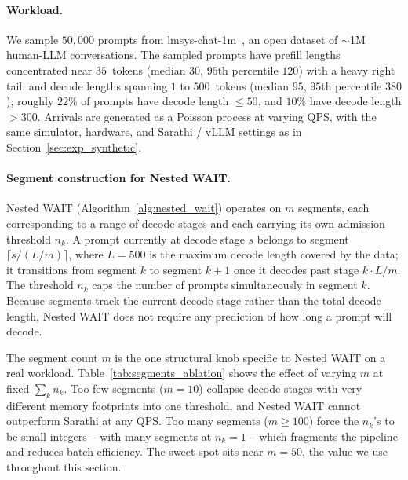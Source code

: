 \paragraph{Workload.}
We sample $50{,}000$ prompts from lmsys-chat-1m~\citep{zheng2023lmsys}, an open dataset of $\sim$1M human-LLM conversations. The sampled prompts have prefill lengths concentrated near $35$~tokens (median $30$, $95$th percentile $120$) with a heavy right tail, and decode lengths spanning $1$ to $500$~tokens (median $95$, $95$th percentile $380$); roughly $22\%$ of prompts have decode length $\leq 50$, and $10\%$ have decode length $> 300$. Arrivals are generated as a Poisson process at varying QPS, with the same simulator, hardware, and Sarathi / vLLM settings as in Section~\ref{sec:exp_synthetic}.

\paragraph{Segment construction for Nested WAIT.}
Nested WAIT (Algorithm~\ref{alg:nested_wait}) operates on $m$ segments, each corresponding to a range of decode stages and each carrying its own admission threshold $n_k$. A prompt currently at decode stage $s$ belongs to segment $\lceil s / (L/m) \rceil$, where $L = 500$ is the maximum decode length covered by the data; it transitions from segment $k$ to segment $k{+}1$ once it decodes past stage $k \cdot L/m$. The threshold $n_k$ caps the number of prompts simultaneously in segment $k$. Because segments track the current decode stage rather than the total decode length, Nested WAIT does not require any prediction of how long a prompt will decode.

The segment count $m$ is the one structural knob specific to Nested WAIT on a real workload. Table~\ref{tab:segments_ablation} shows the effect of varying $m$ at fixed $\sum_k n_k$. Too few segments ($m = 10$) collapse decode stages with very different memory footprints into one threshold, and Nested WAIT cannot outperform Sarathi at any QPS. Too many segments ($m \geq 100$) force the $n_k$'s to be small integers -- with many segments at $n_k = 1$ -- which fragments the pipeline and reduces batch efficiency. The sweet spot sits near $m = 50$, the value we use throughout this section.

